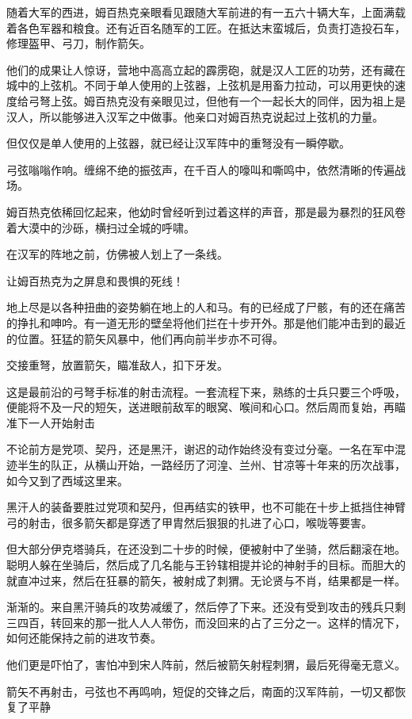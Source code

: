 随着大军的西进，姆百热克亲眼看见跟随大军前进的有一五六十辆大车，上面满载着各色军器和粮食。还有近百名随军的工匠。在抵达末蛮城后，负责打造投石车，修理盔甲、弓刀，制作箭矢。

他们的成果让人惊讶，营地中高高立起的霹雳砲，就是汉人工匠的功劳，还有藏在城中的上弦机。不同于单人使用的上弦器，上弦机是用畜力拉动，可以用更快的速度给弓弩上弦。姆百热克没有亲眼见过，但他有一个一起长大的同伴，因为祖上是汉人，所以能够进入汉军之中做事。他亲口对姆百热克说起过上弦机的力量。

但仅仅是单人使用的上弦器，就已经让汉军阵中的重弩没有一瞬停歇。

弓弦嗡嗡作响。缠绵不绝的振弦声，在千百人的嚎叫和嘶鸣中，依然清晰的传遍战场。

姆百热克依稀回忆起来，他幼时曾经听到过着这样的声音，那是最为暴烈的狂风卷着大漠中的沙砾，横扫过全城的呼啸。

在汉军的阵地之前，仿佛被人划上了一条线。

让姆百热克为之屏息和畏惧的死线！

地上尽是以各种扭曲的姿势躺在地上的人和马。有的已经成了尸骸，有的还在痛苦的挣扎和呻吟。有一道无形的壁垒将他们拦在十步开外。那是他们能冲击到的最近的位置。狂猛的箭矢风暴中，他们再向前半步亦不可得。

交接重弩，放置箭矢，瞄准敌人，扣下牙发。

这是最前沿的弓弩手标准的射击流程。一套流程下来，熟练的士兵只要三个呼吸，便能将不及一尺的短矢，送进眼前敌军的眼窝、喉间和心口。然后周而复始，再瞄准下一人开始射击

不论前方是党项、契丹，还是黑汗，谢迟的动作始终没有变过分毫。一名在军中混迹半生的队正，从横山开始，一路经历了河湟、兰州、甘凉等十年来的历次战事，如今又到了西域这里来。

黑汗人的装备要胜过党项和契丹，但再结实的铁甲，也不可能在十步上抵挡住神臂弓的射击，很多箭矢都是穿透了甲胄然后狠狠的扎进了心口，喉咙等要害。

但大部分伊克塔骑兵，在还没到二十步的时候，便被射中了坐骑，然后翻滚在地。聪明人躲在坐骑后，然后成了几名能与王钤辖相提并论的神射手的目标。而胆大的就直冲过来，然后在狂暴的箭矢，被射成了刺猬。无论贤与不肖，结果都是一样。

渐渐的。来自黑汗骑兵的攻势减缓了，然后停了下来。还没有受到攻击的残兵只剩三四百，转回来的那一批人人人带伤，而没回来的占了三分之一。这样的情况下，如何还能保持之前的进攻节奏。

他们更是吓怕了，害怕冲到宋人阵前，然后被箭矢射程刺猬，最后死得毫无意义。

箭矢不再射击，弓弦也不再鸣响，短促的交锋之后，南面的汉军阵前，一切又都恢复了平静

